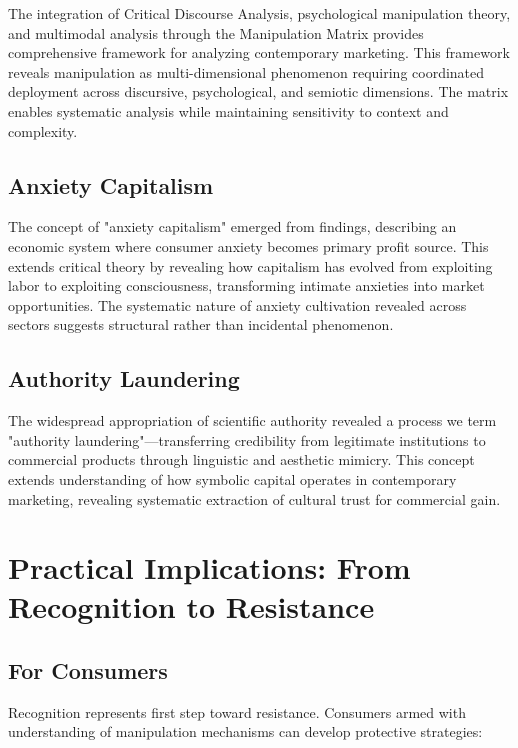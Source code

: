 The integration of Critical Discourse Analysis, psychological manipulation theory, and multimodal analysis through the Manipulation Matrix provides comprehensive framework for analyzing contemporary marketing. This framework reveals manipulation as multi-dimensional phenomenon requiring coordinated deployment across discursive, psychological, and semiotic dimensions. The matrix enables systematic analysis while maintaining sensitivity to context and complexity.

\subsection{Anxiety Capitalism}

The concept of "anxiety capitalism" emerged from findings, describing an economic system where consumer anxiety becomes primary profit source. This extends critical theory by revealing how capitalism has evolved from exploiting labor to exploiting consciousness, transforming intimate anxieties into market opportunities. The systematic nature of anxiety cultivation revealed across sectors suggests structural rather than incidental phenomenon.

\subsection{Authority Laundering}

The widespread appropriation of scientific authority revealed a process we term "authority laundering"—transferring credibility from legitimate institutions to commercial products through linguistic and aesthetic mimicry. This concept extends understanding of how symbolic capital operates in contemporary marketing, revealing systematic extraction of cultural trust for commercial gain.

\section{Practical Implications: From Recognition to Resistance}
\label{sec:practical_implications}

\subsection{For Consumers}

Recognition represents first step toward resistance. Consumers armed with understanding of manipulation mechanisms can develop protective strategies:

